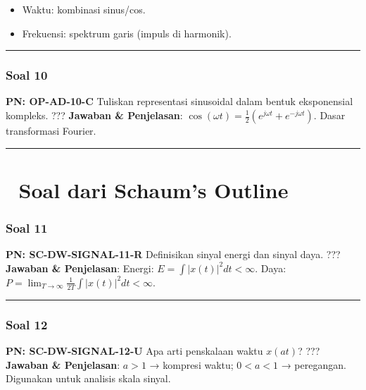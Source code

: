 \documentclass[
  letterpaper,
  DIV=11,
  numbers=noendperiod]{scrreprt}
\providecommand{\tightlist}{%
  \setlength{\itemsep}{0pt}\setlength{\parskip}{0pt}}
\begin{document}
\begin{itemize}
\tightlist
\item
  Waktu: kombinasi sinus/cos.
\item
  Frekuensi: spektrum garis (impuls di harmonik).
\end{itemize}

\begin{center}\rule{0.5\linewidth}{0.5pt}\end{center}

\subsection{Soal 10}\label{soal-10}

\textbf{PN: OP-AD-10-C} Tuliskan representasi sinusoidal dalam bentuk
eksponensial kompleks. ??? \textbf{Jawaban \& Penjelasan}:
\(\cos(\omega t)=\tfrac{1}{2}(e^{j\omega t}+e^{-j\omega t})\). Dasar
transformasi Fourier.

\begin{center}\rule{0.5\linewidth}{0.5pt}\end{center}


\chapter{📗 Soal dari Schaum's Outline}\label{soal-dari-schaums-outline}

\subsection{Soal 11}\label{soal-11}

\textbf{PN: SC-DW-SIGNAL-11-R} Definisikan sinyal energi dan sinyal
daya. ??? \textbf{Jawaban \& Penjelasan}: Energi:
\(E=\int |x(t)|^2dt<\infty\). Daya:
\(P=\lim_{T\to\infty}\frac{1}{2T}\int |x(t)|^2dt<\infty\).

\begin{center}\rule{0.5\linewidth}{0.5pt}\end{center}

\subsection{Soal 12}\label{soal-12}

\textbf{PN: SC-DW-SIGNAL-12-U} Apa arti penskalaan waktu \(x(at)\)? ???
\textbf{Jawaban \& Penjelasan}: \(a>1\) → kompresi waktu; \(0<a<1\) →
peregangan. Digunakan untuk analisis skala sinyal.
\end{document}
